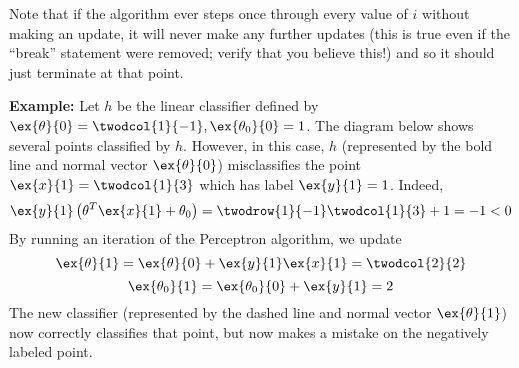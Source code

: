 Note that if the algorithm ever steps once through every value of $i$
without making an update, it will never make any further updates (this
is true even if the ``break'' statement were removed; verify that you
believe this!) and so it should just terminate at that point.

\begin{examplebox}{\bf Example:}
  Let $h$ be the linear classifier defined by $\ex{\theta}{0} =
    \protect\twodcol{1}{-1}, \ex{\theta_0}{0} = 1$.
  \noindent
  The diagram below shows several points classified by $h$.  However, in
  this case, $h$ (represented by the bold line and normal vector $\ex{\theta}{0}$) misclassifies the point
  $\ex{x}{1} = \twodcol{1}{3}$ which has label $\ex{y}{1} = 1$.  Indeed,
  $$ \ex{y}{1}\left(\theta^T \ex{x}{1} + \theta_0\right) =  \twodrow{1}{-1}
    \twodcol{1}{3} + 1 = -1 < 0 $$
  By running an iteration of the Perceptron algorithm, we update
  $$ \ex{\theta}{1} = \ex{\theta}{0} + \ex{y}{1}\ex{x}{1} = \twodcol{2}{2} $$
  $$ \ex{\theta_0}{1} = \ex{\theta_0}{0} + \ex{y}{1} = 2 $$
  The new classifier (represented by the dashed line and normal vector $\ex{\theta}{1}$) now correctly
  classifies that point, but now makes a mistake on the negatively
  labeled point.

  \begin{center}
  \end{center}
\end{examplebox}

